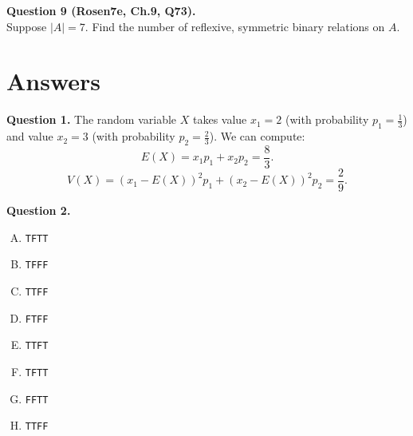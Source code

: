 \documentclass[jou]{apa6}
\begin{document}
\vspace{6pt}
{\bf Question 9 (Rosen7e, Ch.9, Q73).}\\
Suppose $|A| = 7$. Find the number of reflexive, symmetric binary relations on $A$.

\newpage

\section{Answers}


\vspace{6pt}
{\bf Question 1.} 
The random variable $X$ takes value $x_1 = 2$ (with probability $p_1 = \frac{1}{3}$)
and value $x_2 = 3$ (with probability $p_2 = \frac{2}{3}$). 
We can compute: 
$$E(X) = x_1p_1 + x_2p_2 = \frac{8}{3}.$$
$$V(X) = (x_1 - E(X))^2p_1 + (x_2 - E(X))^2p_2 = \frac{2}{9}.$$

\vspace{6pt}
{\bf Question 2.} 
\begin{enumerate}[(A)]
\item {\tt TFTT}
\item {\tt TFFF}
\item {\tt TTFF}
\item {\tt FTFF}
\item {\tt TTFT}
\item {\tt TFTT}
\item {\tt FFTT}
\item {\tt TTFF}
\end{enumerate}
\end{document}
